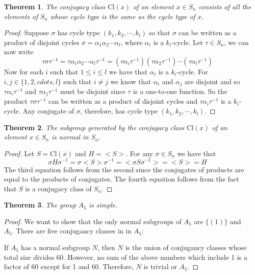\documentclass[a4paper,10pt]{article}
\newtheorem{theorem}{Theorem}
\begin{document}
\begin{theorem}
The conjugacy class $\textrm{Cl}(x)$ of an element $x \in S_n$ consists of all the elements of $S_n$ whose cycle type is the same as the cycle type of $x$.  
\end{theorem}

\begin{proof}
Suppose $\sigma$ has cycle type $(k_1,k_2,\cdots,k_l)$ so that $\sigma$ can be written as a product of disjoint cycles $\sigma = \alpha_1\alpha_2\cdots \alpha_l$, where $\alpha_i$ is a $k_i$-cycle. Let $\tau\in S_n$, we can now write
\begin{equation}
\tau \sigma \tau^{-1} = \tau \alpha_i\alpha_2\cdots\alpha_l\tau^{-1}=(\tau \alpha_i\tau^{-1})(\tau\alpha_2\tau^{-1})\cdots(\tau\alpha_l\tau^{-1}) 
\end{equation}
Now for each $i$ such that $1\leq i\leq l$ we have that $\alpha_i$ is a $k_i$-cycle. For $i,j\in\{1,2,cdots,l\}$
such that $i\neq j$ we know that $\alpha_i$ and $\alpha_j$ are disjoint and so $\tau\alpha_i\tau^{-1}$ and $\tau\alpha_j\tau^{-1}$ must be disjoint since $\tau$ is a one-to-one function. So the product $\tau\sigma\tau^{-1}$ can be written as a product of disjoint cycles and $\tau\alpha_i\tau^{-1}$ is a $k_i$-cycle. Any conjugate of $\sigma$, therefore, has cycle type $(k_1,k_2,\cdots,k_l)$.  
\end{proof}

\begin{theorem}
The subgroup generated by the conjugacy class $\textrm{Cl}(x)$ of an element $x \in S_n$ is normal in $S_n$.   
\end{theorem}
\begin{proof}
Let $S = \textrm{Cl}(x)$ and $H = <S>$. For any $\sigma\in S_n$ we have that
\begin{equation}
\sigma H \sigma^{-1} = \sigma <S> \sigma^{-1} = <\sigma S \sigma^{-1}> = <S> = H 
\end{equation}
The third equation follows from the second since the conjugates of products are equal to the products of conjugates. The fourth equation follows from the fact that $S$ is a conjugacy class of $S_n$.
\end{proof}

\begin{theorem}
The group $A_5$ is simple. 
\end{theorem}

\begin{proof}
We want to show that the only normal subgroups of $A_5$ are $\{(1)\}$ and $A_5$. There are five conjugancy classes in in $A_5$:


If $A_5$ has a normal subgroup $N$, then $N$ is the union of conjugancy classes whose total size divides 60. However, no sum of the above numbers which include 1 is a factor of 60 except for 1 and 60. Therefore, $N$ is trivial or $A_5$.
\end{proof}
\end{document}
